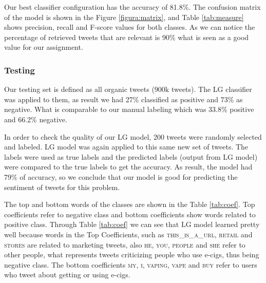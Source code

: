 \documentclass{sig-alternate}
\begin{document}
Our best classifier configuration has the accuracy of 81.8\%. The confusion matrix of the model is shown in the Figure \ref{figura:matrix}, and Table \ref{tab:measure} shows precision, recall and F-score values for both classes. As we can notice the percentage of retrieved tweets that are relevant is 90\% what is seen as a good value for our assignment.




\subsubsection{Testing}
\label{sec:test}
Our testing set is defined as all organic tweets (900k tweets). The LG classifier was applied to them, as result we had 27\% classified as positive and 73\% as negative. What is comparable to our manual labeling which was 33.8\% positive and 66.2\% negative. 

In order to check the quality of our LG model, 200 tweets were randomly selected and labeled. LG model was again applied to this same new set of tweets. The labels were used as true labels and the predicted labels (output from LG model) were compared to the true labels to get the accuracy. As result, the model had 79\% of accuracy, so we conclude that our model is good for predicting the sentiment of tweets for this problem.

The top and bottom words of the classes are shown in the Table \ref{tab:coef}. Top coefficients refer to negative class and bottom coefficients show words related to positive class. Through Table \ref{tab:coef} we can see that LG model learned pretty well because words in the Top Coefficients, such as \textsc{this\_is\_a\_url}, \textsc{retail} and \textsc{stores} are related to marketing tweets, also \textsc{he}, \textsc{you}, \textsc{people} and \textsc{she} refer to other people, what represents tweets criticizing people who use e-cigs, thus being negative class. The bottom coefficients \textsc{my}, \textsc{i}, \textsc{vaping}, \textsc{vape} and \textsc{buy} refer to users who tweet about getting or using e-cigs.
\end{document}
